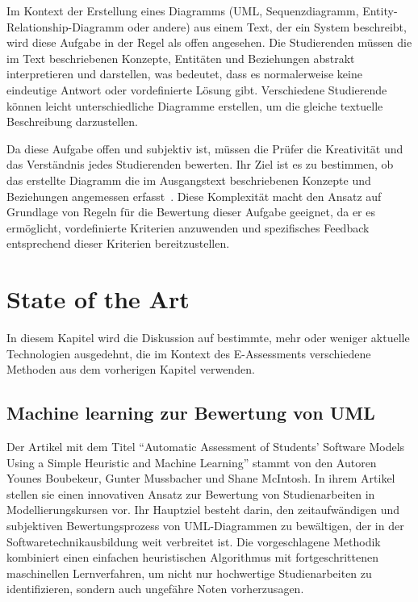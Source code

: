 Im Kontext der Erstellung eines Diagramms (UML, Sequenzdiagramm, Entity-Relationship-Diagramm oder andere) aus einem Text, der ein System beschreibt, wird diese Aufgabe in der Regel als offen angesehen. Die Studierenden müssen die im Text beschriebenen Konzepte, Entitäten und Beziehungen abstrakt interpretieren und darstellen, was bedeutet, dass es normalerweise keine eindeutige Antwort oder vordefinierte Lösung gibt. Verschiedene Studierende können leicht unterschiedliche Diagramme erstellen, um die gleiche textuelle Beschreibung darzustellen.

Da diese Aufgabe offen und subjektiv ist, müssen die Prüfer die Kreativität und das Verständnis jedes Studierenden bewerten. Ihr Ziel ist es zu bestimmen, ob das erstellte Diagramm die im Ausgangstext beschriebenen Konzepte und Beziehungen angemessen erfasst~\cite{fellmann2016evaluation}. Diese Komplexität macht den Ansatz auf Grundlage von Regeln für die Bewertung dieser Aufgabe geeignet, da er es ermöglicht, vordefinierte Kriterien anzuwenden und spezifisches Feedback entsprechend dieser Kriterien bereitzustellen.


\section{State of the Art}

In diesem Kapitel wird die Diskussion auf bestimmte, mehr oder weniger aktuelle Technologien ausgedehnt, die im Kontext des E-Assessments verschiedene Methoden aus dem vorherigen Kapitel verwenden.

\subsection{Machine learning zur Bewertung von UML}

Der Artikel mit dem Titel ``Automatic Assessment of Students’ Software Models Using a Simple Heuristic and Machine Learning'' \cite{boubekeur2020automatic} stammt von den Autoren Younes Boubekeur, Gunter Mussbacher und Shane McIntosh. In ihrem Artikel stellen sie einen innovativen Ansatz zur Bewertung von Studienarbeiten in Modellierungskursen vor. Ihr Hauptziel besteht darin, den zeitaufwändigen und subjektiven Bewertungsprozess von UML-Diagrammen zu bewältigen, der in der Softwaretechnikausbildung weit verbreitet ist. Die vorgeschlagene Methodik kombiniert einen einfachen heuristischen Algorithmus mit fortgeschrittenen maschinellen Lernverfahren, um nicht nur hochwertige Studienarbeiten zu identifizieren, sondern auch ungefähre Noten vorherzusagen.

